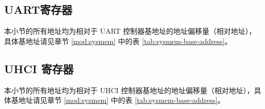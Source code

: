 \documentclass[main\_\_CN.tex]{subfiles}
\begin{document}
\subsection{UART寄存器}

本小节的所有地址均为相对于 UART 控制器基地址的地址偏移量（相对地址），具体基地址请见章节 \ref{mod:sysmem} \textit{} 中的表 \ref{tab:sysmem-base-address}。



\clearpage
\subsection{UHCI 寄存器}

本小节的所有地址均为相对于 UHCI 控制器基地址的地址偏移量（相对地址），具体基地址请见章节 \ref{mod:sysmem} \textit{} 中的表 \ref{tab:sysmem-base-address}。


\end{document}
